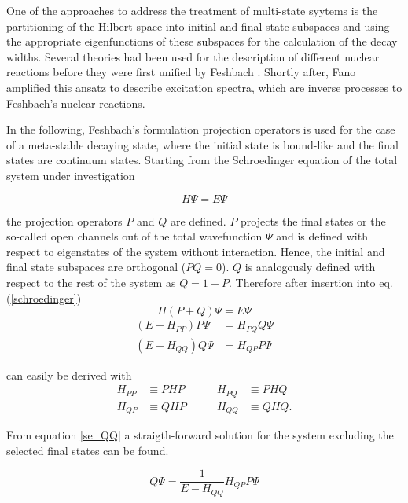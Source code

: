 One of the approaches to address the treatment of multi-state syytems is the
partitioning of the Hilbert space into initial and final
state subspaces and using the appropriate eigenfunctions of these subspaces for the
calculation of the decay widths. 
Several theories had been used for the description of different nuclear reactions
before they were first unified by Feshbach \cite{Feshbach58,Feshbach62,Feshbach_book}.
Shortly after,
Fano amplified this ansatz to describe excitation spectra, which
are inverse processes to Feshbach's nuclear reactions.\cite{Fano61}


In the following, Feshbach's formulation projection
operators is used for the case of a meta-stable decaying state, where the initial state
is bound-like and the final states are continuum states.
Starting from the Schroedinger equation of the total system under investigation

\begin{equation}
  H \Psi = E \Psi \label{schroedinger}
\end{equation}

the projection operators $P$ and $Q$ are defined. $P$ projects the final states
or the so-called open channels out
of the total wavefunction $\Psi$ and is defined with respect to eigenstates
of the system without interaction. Hence, the initial and final state subspaces
are orthogonal ($PQ=0$).
$Q$ is analogously defined with respect to the rest of the
system as $Q = 1 - P$. Therefore after insertion into eq. (\ref{schroedinger})
\begin{equation}
  H (P+Q) \Psi = E \Psi
\end{equation}
\begin{align}
  (E - H_{PP}) P \Psi & = H_{PQ} Q \Psi \label{se_PP}\\
  (E - H_{QQ}) Q \Psi & = H_{QP} P \Psi \label{se_QQ}
\end{align}

can easily be derived with
\begin{align*}
  H_{PP} & \equiv PHP & \quad\quad H_{PQ} & \equiv PHQ\\
  H_{QP} & \equiv QHP & \quad\quad H_{QQ} & \equiv QHQ .
\end{align*}

From equation \ref{se_QQ} a straigth-forward solution for the system excluding
the selected final states can be found.

\begin{equation}
  Q \Psi = \frac{1}{E-H_{QQ}} H_{QP} P \Psi \label{feshbach_qpsi}
\end{equation}

